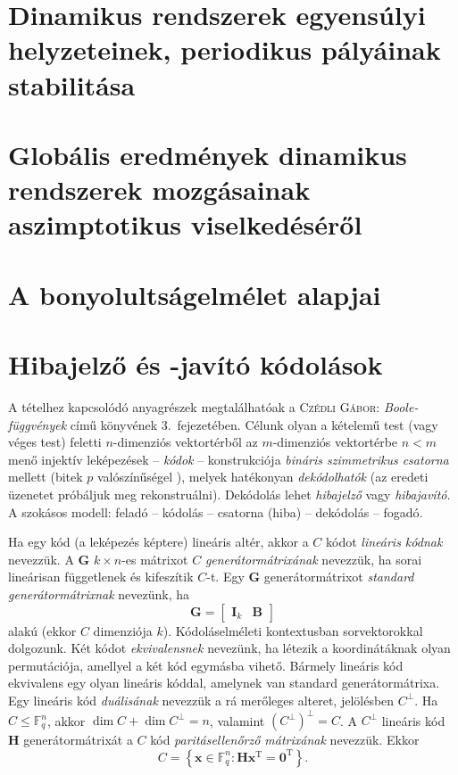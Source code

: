 \documentclass[DIV=15,appendixprefix]{scrreprt}
\theoremstyle{definition}
\theoremstyle{remark}
\DeclareMathOperator{\T}{T}
\begin{document}
\section{Dinamikus rendszerek egyensúlyi helyzeteinek, periodikus pályáinak stabilitása}
%
\section{Globális eredmények dinamikus rendszerek mozgásainak aszimptotikus viselkedéséről}
%
\section{A bonyolultságelmélet alapjai}
%
\section{Hibajelző és -javító kódolások}
A tételhez kapcsolódó anyagrészek megtalálhatóak a \textsc{Czédli Gábor}: \emph{Boole-függvények}
\cite{Czedli} című könyvének 3.~fejezetében.
%
Célunk olyan a kételemű test (vagy véges test) feletti $ n $-dimenziós vektortérből az
$ m $-dimenziós vektortérbe
$ n < m $ menő injektív leképezések -- \emph{kódok} -- konstrukciója \emph{bináris
szimmetrikus csatorna} mellett (bitek $ p $ valószínűségel ), melyek hatékonyan
\emph{dekódolhatók} (az eredeti üzenetet próbáljuk meg rekonstruálni). Dekódolás lehet
\emph{hibajelző} vagy \emph{hibajavító}. A szokásos modell: feladó -- kódolás -- csatorna (hiba) --
dekódolás -- fogadó.

Ha egy kód (a leképezés képtere) lineáris altér, akkor a $ C $ kódot \emph{lineáris kódnak}
nevezzük. A $ \mathbf{ G } $ $ k \times n $-es mátrixot $ C $ \emph{generátormátrixának} nevezzük,
ha sorai lineárisan függetlenek és kifeszítik $ C $-t. Egy $ \mathbf{ G } $ generátormátrixot
\emph{standard generátormátrixnak} nevezünk, ha
\begin{equation*}
	\mathbf{ G } = \begin{bmatrix}
		\mathbf{ I }_{ k } & \mathbf{ B }
	\end{bmatrix}
\end{equation*}
alakú (ekkor $ C $ dimenziója $ k $). Kódoláselméleti kontextusban sorvektorokkal dolgozunk. Két
kódot  \emph{ekvivalensnek} nevezünk, ha létezik a koordinátáknak olyan permutációja,
amellyel a két kód egymásba vihető. Bármely lineáris kód ekvivalens egy olyan lineáris kóddal,
amelynek van standard generátormátrixa.
%
Egy lineáris kód \emph{duálisának} nevezzük a rá merőleges alteret, jelölésben $ C^{ \perp } $. Ha
$ C \le \mathbb{ F }_{ q }^{ n } $, akkor $ \dim C + \dim C^{ \perp } = n $, valamint $ \left(
C^{ \perp } \right)^{ \perp } = C $. A $ C^{ \perp } $ lineáris kód $ \mathbf{ H } $
generátormátrixát a $ C $ kód \emph{paritásellenőrző mátrixának} nevezzük. Ekkor
\begin{equation*}
	C = \left\{ \mathbf{ x } \in \mathbb{ F }_{ q }^{ n } \colon \mathbf{ H } \mathbf{ x }^{ \T }
	= \mathbf{ 0 }^{ \T } \right\}.
\end{equation*}
\end{document}
